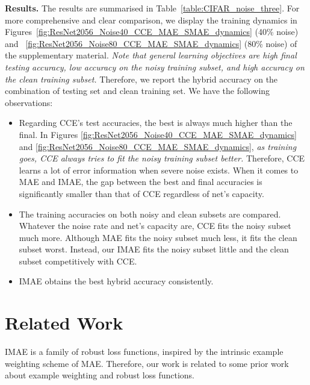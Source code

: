 \documentclass{article}
\begin{document}
\noindent 
\textbf{Results.} 
The results are summarised in Table~\ref{table:CIFAR_noise_three}. 
For more comprehensive and clear comparison, we display the training dynamics in Figures~\ref{fig:ResNet2056_Noise40_CCE_MAE_SMAE_dynamics} (40\% noise) and ~\ref{fig:ResNet2056_Noise80_CCE_MAE_SMAE_dynamics} (80\% noise) of the supplementary material. 
\textit{Note that general learning objectives are high final testing accuracy, low accuracy on the noisy training subset, and high accuracy on the clean training subset.} 
Therefore, we report the hybrid accuracy on the combination of testing set and clean training set. 
We have the following observations:
\begin{itemize}
	\vspace{-0.2cm}
	\item Regarding CCE's test accuracies, the best is always much higher than the final. 
In Figures \ref{fig:ResNet2056_Noise40_CCE_MAE_SMAE_dynamics} and \ref{fig:ResNet2056_Noise80_CCE_MAE_SMAE_dynamics}, \textit{as training goes, CCE always tries to fit the noisy training subset better.} Therefore, CCE learns a lot of error information  when severe noise exists.  
	When it comes to 
	MAE and IMAE, the gap between the best and final accuracies is significantly smaller than that of CCE regardless of net's capacity. 
	
	\vspace{-0.2cm}
	\item The training accuracies on both noisy and clean subsets are compared.
Whatever the noise rate and net's capacity are, CCE fits the noisy subset much more. 
Although MAE fits the noisy subset much less, it fits the clean subset worst. 
	Instead, our IMAE fits the noisy subset little and the clean subset competitively with CCE.
	
	\vspace{-0.2cm}
	\item IMAE obtains the best hybrid accuracy consistently. 
\end{itemize}
\vspace{-0.2cm}











\section{Related Work}


IMAE is a family of robust loss functions, inspired by the intrinsic example weighting scheme of MAE. 
Therefore, 
our work is related to some prior work about example weighting  and robust loss functions.
\end{document}
